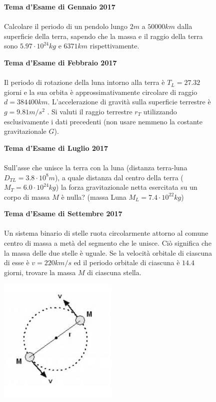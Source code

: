 \begin{figure}[h!]
\textbf{Tema d'Esame di Gennaio 2017}\\ \\
Calcolare il periodo di un pendolo lungo $2 m$ a $50000 km$ dalla superficie della terra, sapendo che la massa e il raggio della terra sono $5.97\cdot 10^{24} kg$ e $6371 km $ rispettivamente.
\end{figure}

\begin{figure}[h!]
\textbf{Tema d'Esame di Febbraio 2017}\\ \\
 Il periodo di rotazione della luna intorno alla terra è $T_L = 27.32$ giorni e la sua orbita è approssimativamente circolare di raggio $d = 384400 km$. L’accelerazione di gravità sulla
superficie terrestre è $g = 9.81 m/s^2$
. Si valuti il raggio terrestre $r_T$ utilizzando esclusivamente i dati precedenti (non usare nemmeno la costante gravitazionale $G$).
\end{figure}

\begin{figure}[h!]
\textbf{Tema d'Esame di Luglio 2017}\\ \\
Sull'asse che unisce la terra con la luna (distanza terra-luna $D_{TL} =3.8\cdot 10^8 m$), a quale distanza dal centro della terra ($M_T = 6.0\cdot 10^{24} kg$) la forza gravitazionale netta esercitata su un corpo di massa $M$ è nulla? (massa Luna $M_L = 7.4\cdot 10^{22} kg$)
\end{figure}

\begin{figure}[h!]
\textbf{Tema d'Esame di Settembre 2017}\\ \\
Un sistema binario di stelle ruota circolarmente attorno al comune centro di massa a metà del segmento che le unisce. Ciò significa che la massa delle due stelle è uguale. Se la velocità orbitale di ciascuna di esse è $v = 220 km/s$ ed il
periodo orbitale di ciascuna è $14.4$ giorni, trovare la massa $M$ di ciascuna stella. 
\begin{center}
		\includegraphics[scale=1]{ES3/SET032017.jpg}
\end{center}
\end{figure}